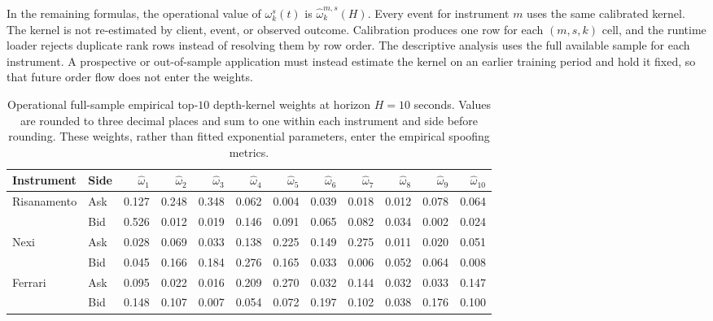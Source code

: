 \documentclass[11pt]{article}
\begin{document}
In the remaining formulas, the operational value of $\omega^{s}_{k}(t)$ is
$\widehat\omega^{m,s}_{k}(H)$. Every event for instrument $m$ uses the same calibrated kernel. The kernel is not
re-estimated by client, event, or observed outcome. Calibration produces one row for each $(m,s,k)$ cell, and the runtime
loader rejects duplicate rank rows instead of resolving them by row order. The descriptive analysis uses the full
available sample for each instrument. A prospective or out-of-sample application must instead estimate the kernel on an
earlier training period and hold it fixed, so that future order flow does not enter the weights.

\begin{table}[htbp]
\centering
\caption{Operational full-sample empirical top-$10$ depth-kernel weights at horizon $H=10$ seconds. Values are rounded to
three decimal places and sum to one within each instrument and side before rounding. These weights, rather than fitted
exponential parameters, enter the empirical spoofing metrics.}
\label{tab:empirical_depth_kernel_calibration}
\scriptsize
\setlength{\tabcolsep}{1.7pt}
\begin{tabular}{ll*{10}{r}}
\toprule
Instrument & Side & $\widehat\omega_1$ & $\widehat\omega_2$ & $\widehat\omega_3$ & $\widehat\omega_4$ & $\widehat\omega_5$ & $\widehat\omega_6$ & $\widehat\omega_7$ & $\widehat\omega_8$ & $\widehat\omega_9$ & $\widehat\omega_{10}$ \\
\midrule
Risanamento & Ask & 0.127 & 0.248 & 0.348 & 0.062 & 0.004 & 0.039 & 0.018 & 0.012 & 0.078 & 0.064 \\
             & Bid & 0.526 & 0.012 & 0.019 & 0.146 & 0.091 & 0.065 & 0.082 & 0.034 & 0.002 & 0.024 \\
Nexi        & Ask & 0.028 & 0.069 & 0.033 & 0.138 & 0.225 & 0.149 & 0.275 & 0.011 & 0.020 & 0.051 \\
             & Bid & 0.045 & 0.166 & 0.184 & 0.276 & 0.165 & 0.033 & 0.006 & 0.052 & 0.064 & 0.008 \\
Ferrari     & Ask & 0.095 & 0.022 & 0.016 & 0.209 & 0.270 & 0.032 & 0.144 & 0.032 & 0.033 & 0.147 \\
             & Bid & 0.148 & 0.107 & 0.007 & 0.054 & 0.072 & 0.197 & 0.102 & 0.038 & 0.176 & 0.100 \\
\bottomrule
\end{tabular}
\end{table}
\end{document}
